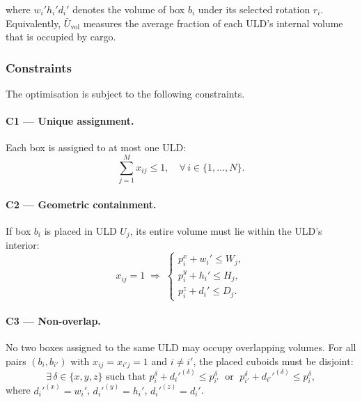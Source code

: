 \noindent
where $w_i' h_i' d_i'$ denotes the volume of box $b_i$ under its
selected rotation $r_i$.
Equivalently, $\bar{U}_{\mathrm{vol}}$ measures the average fraction of
each ULD's internal volume that is occupied by cargo.

\subsubsection*{Constraints}

The optimisation is subject to the following constraints.

\paragraph{C1 — Unique assignment.}
Each box is assigned to at most one ULD:
\begin{equation}
\label{eq:unique}
\sum_{j=1}^{M} x_{ij} \leq 1, \quad \forall\, i \in \{1,\ldots,N\}.
\end{equation}

\paragraph{C2 — Geometric containment.}
If box $b_i$ is placed in ULD $U_j$, its entire volume must lie within
the ULD's interior:
\begin{equation}
\label{eq:containment}
x_{ij} = 1 \;\Rightarrow\;
\begin{cases}
  p_i^x + w_i' \leq W_j,\\
  p_i^y + h_i' \leq H_j,\\
  p_i^z + d_i' \leq D_j.
\end{cases}
\end{equation}

\paragraph{C3 — Non-overlap.}
No two boxes assigned to the same ULD may occupy overlapping volumes.
For all pairs $(b_i, b_{i'})$ with $x_{ij} = x_{i'j} = 1$ and $i \neq i'$,
the placed cuboids must be disjoint:
\begin{equation}
\label{eq:nooverlap}
\exists\, \delta \in \{x, y, z\} \text{ such that }
p_i^{\delta} + d_i'^{(\delta)} \leq p_{i'}^{\delta}
\;\text{ or }\;
p_{i'}^{\delta} + d_{i'}'^{(\delta)} \leq p_i^{\delta},
\end{equation}
where $d_i'^{(x)} = w_i'$, $d_i'^{(y)} = h_i'$, $d_i'^{(z)} = d_i'$.

